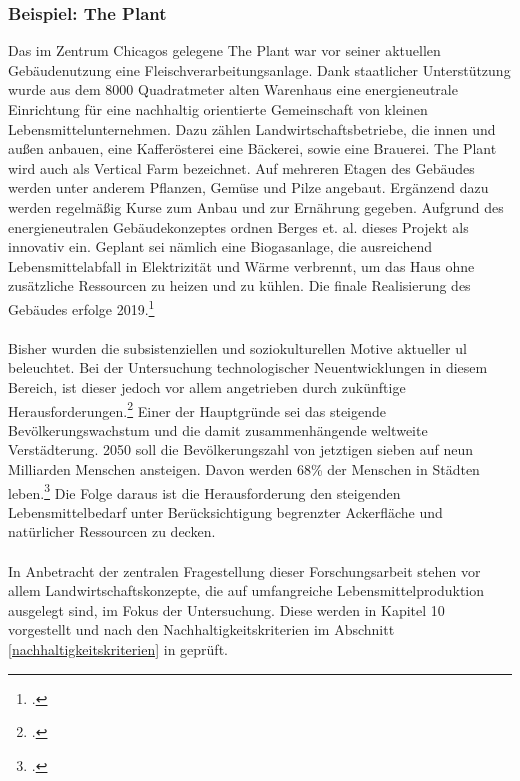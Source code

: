 \documentclass{scrartcl}
\begin{document}
\subsubsection*{Beispiel: The Plant}
Das im Zentrum Chicagos gelegene The Plant war vor seiner aktuellen Gebäudenutzung eine Fleischverarbeitungsanlage. Dank staatlicher Unterstützung wurde aus dem 8000 Quadratmeter alten Warenhaus eine energieneutrale Einrichtung für eine nachhaltig orientierte Gemeinschaft von kleinen Lebensmittelunternehmen. Dazu zählen Landwirtschaftsbetriebe, die innen und außen anbauen, eine Kafferösterei eine Bäckerei, sowie eine Brauerei. The Plant wird auch als Vertical Farm bezeichnet. Auf mehreren Etagen des Gebäudes werden unter anderem Pflanzen, Gemüse und Pilze angebaut. Ergänzend dazu werden regelmäßig Kurse zum Anbau und zur Ernährung gegeben. Aufgrund des energieneutralen Gebäudekonzeptes ordnen Berges et. al. dieses Projekt als innovativ ein. Geplant sei nämlich eine Biogasanlage, die ausreichend Lebensmittelabfall in Elektrizität und Wärme verbrennt, um das Haus ohne zusätzliche Ressourcen zu heizen und zu kühlen. Die finale Realisierung des Gebäudes erfolge 2019.\footcites[Vgl.][S.18]{Al-Kodmany2018TheCity}{TheLLC}\\
\\
Bisher wurden die subsistenziellen und soziokulturellen Motive aktueller \acs{ul} beleuchtet. Bei der Untersuchung technologischer Neuentwicklungen in diesem Bereich, ist dieser jedoch vor allem angetrieben durch zukünftige Herausforderungen.\footcites[Vgl.][S.238]{Germer2011SkyfarmingSecurity}[sowie][S.6]{PeterMollerVoss2013VerticalRise}[][S.1]{Al-Kodmany2018TheCity} Einer der Hauptgründe sei das steigende Bevölkerungswachstum und die damit zusammenhängende weltweite Verstädterung. 2050 soll die Bevölkerungszahl von jetztigen sieben auf neun Milliarden Menschen ansteigen. Davon werden 68\% der Menschen in Städten leben.\footcite[Vgl.][S.3]{UnitedNationsDepartmentofEconomicandSocialAffairs2017World2017} Die Folge daraus ist die Herausforderung den steigenden Lebensmittelbedarf unter Berücksichtigung begrenzter Ackerfläche und natürlicher Ressourcen zu decken.  \\
\\
In Anbetracht der zentralen Fragestellung dieser Forschungsarbeit stehen vor allem Landwirtschaftskonzepte, die auf umfangreiche Lebensmittelproduktion ausgelegt sind, im Fokus der Untersuchung. Diese werden in Kapitel 10 vorgestellt und nach den Nachhaltigkeitskriterien im Abschnitt \ref{nachhaltigkeitskriterien} in geprüft.
\end{document}
